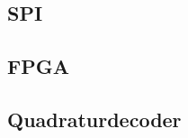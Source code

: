 \documentclass[../../main]{subfiles}
\begin{document}
\subsection{SPI}%
\label{sub:spi}
  


\subsection{FPGA}
\label{sub:fpga}


\subsection{Quadraturdecoder}%

\end{document}
